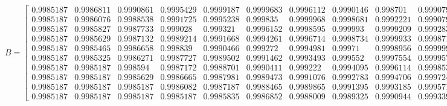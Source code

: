 \begin{equation*}
    B =
    \begin{bmatrix}
        0.9985187 & 0.9986811 & 0.9990861 & 0.9995429 & 0.9999187 &
        0.9999683 & 0.9996112 & 0.9990146 & 0.998701  & 0.9990794 \\
        0.9985187 & 0.9986076 & 0.9988538 & 0.9991725 & 0.9995238 &
        0.999835  & 0.9999968 & 0.9998681 & 0.9992221 & 0.9990794 \\
        0.9985187 & 0.9985827 & 0.9987733 & 0.999028  & 0.999321  &
        0.9996152 & 0.9998595 & 0.999993  & 0.9999209 & 0.9992831 \\
        0.9985187 & 0.9985629 & 0.9987132 & 0.9989214 & 0.9991668 &
        0.9994261 & 0.9996714 & 0.9998734 & 0.9999933 & 0.9998716 \\
        0.9985187 & 0.9985465 & 0.9986658 & 0.998839  & 0.9990466 &
        0.999272  & 0.9994981 & 0.99971   & 0.9998956 & 0.9999992 \\
        0.9985187 & 0.9985325 & 0.9986271 & 0.9987727 & 0.9989502 &
        0.9991462 & 0.9993493 & 0.999552  & 0.9997554 & 0.9999574 \\
        0.9985187 & 0.9985187 & 0.998594  & 0.9987172 & 0.9988701 &
        0.9990411 & 0.999222  & 0.9994095 & 0.9996114 & 0.9998532 \\
        0.9985187 & 0.9985187 & 0.9985629 & 0.9986665 & 0.9987981 &
        0.9989473 & 0.9991076 & 0.9992783 & 0.9994706 & 0.9997244 \\
        0.9985187 & 0.9985187 & 0.9985187 & 0.9986082 & 0.9987187 &
        0.9988465 & 0.9989865 & 0.9991395 & 0.9993185 & 0.9995715 \\
        0.9985187 & 0.9985187 & 0.9985187 & 0.9985187 & 0.9985835 &
        0.9986852 & 0.9988009 & 0.9989325 & 0.9990944 & 0.999339
    \end{bmatrix}
\end{equation*}

